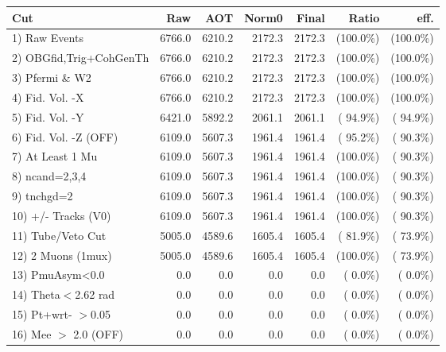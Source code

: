  \begin{table}[h!]\centering
 \begin{tabular}{||l||r|r|r|r|r|r||}
 \hline
 \hline
 Cut & Raw & AOT & Norm0 & Final & Ratio & eff.       \\
 \hline
  1) Raw Events           &       6766.0 &       6210.2 &       2172.3 &       2172.3 & (100.0\%) & (100.0\%) \\
  2) OBGfid,Trig+CohGenTh &       6766.0 &       6210.2 &       2172.3 &       2172.3 & (100.0\%) & (100.0\%) \\
  3) Pfermi \& W2         &       6766.0 &       6210.2 &       2172.3 &       2172.3 & (100.0\%) & (100.0\%) \\
  4) Fid. Vol. -X         &       6766.0 &       6210.2 &       2172.3 &       2172.3 & (100.0\%) & (100.0\%) \\
  5) Fid. Vol. -Y         &       6421.0 &       5892.2 &       2061.1 &       2061.1 & ( 94.9\%) & ( 94.9\%) \\
  6) Fid. Vol. -Z (OFF)   &       6109.0 &       5607.3 &       1961.4 &       1961.4 & ( 95.2\%) & ( 90.3\%) \\
  7) At Least 1 Mu        &       6109.0 &       5607.3 &       1961.4 &       1961.4 & (100.0\%) & ( 90.3\%) \\
  8) ncand=2,3,4          &       6109.0 &       5607.3 &       1961.4 &       1961.4 & (100.0\%) & ( 90.3\%) \\
  9) tnchgd=2             &       6109.0 &       5607.3 &       1961.4 &       1961.4 & (100.0\%) & ( 90.3\%) \\
 10) +/- Tracks (V0)      &       6109.0 &       5607.3 &       1961.4 &       1961.4 & (100.0\%) & ( 90.3\%) \\
 11) Tube/Veto Cut        &       5005.0 &       4589.6 &       1605.4 &       1605.4 & ( 81.9\%) & ( 73.9\%) \\
 12) 2 Muons (1mux)       &       5005.0 &       4589.6 &       1605.4 &       1605.4 & (100.0\%) & ( 73.9\%) \\
 13) PmuAsym<0.0          &          0.0 &          0.0 &          0.0 &          0.0 & (  0.0\%) & (  0.0\%) \\
 14) Theta$<$2.62 rad     &          0.0 &          0.0 &          0.0 &          0.0 & (  0.0\%) & (  0.0\%) \\
 15) Pt+wrt- $>$0.05      &          0.0 &          0.0 &          0.0 &          0.0 & (  0.0\%) & (  0.0\%) \\
 16) Mee $>$ 2.0  (OFF)   &          0.0 &          0.0 &          0.0 &          0.0 & (  0.0\%) & (  0.0\%) \\

\end{tabular}
\end{table}
